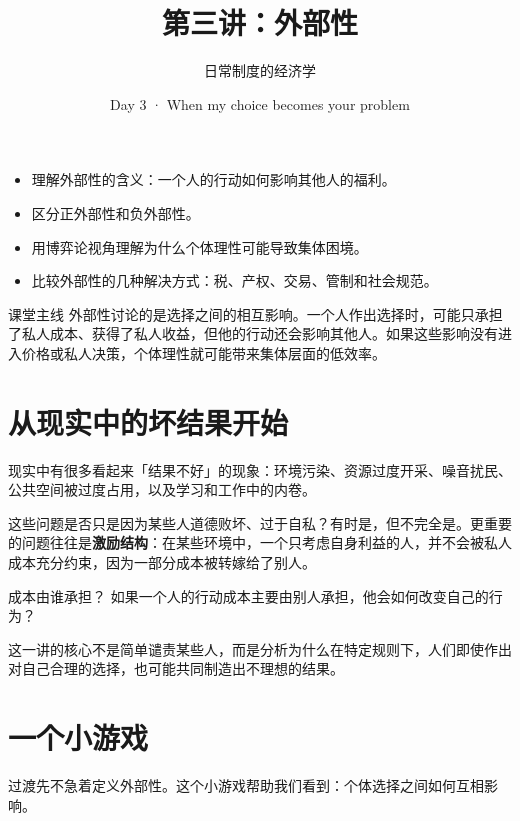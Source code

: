 \documentclass[10pt,a4paper]{ctexart}
\title{\vspace{-2em}\bfseries 第三讲：外部性}
\author{日常制度的经济学}
\date{Day 3 · When my choice becomes your problem}
\newcommand{\transitionnote}[1]{\begin{conceptbox}{过渡}#1\end{conceptbox}}
\begin{document}
\maketitle
\thispagestyle{fancy}

\begin{goalsbox}
\begin{itemize}
  \item 理解外部性的含义：一个人的行动如何影响其他人的福利。
  \item 区分正外部性和负外部性。
  \item 用博弈论视角理解为什么个体理性可能导致集体困境。
  \item 比较外部性的几种解决方式：税、产权、交易、管制和社会规范。
\end{itemize}
\end{goalsbox}

\begin{keybox}{课堂主线}
外部性讨论的是选择之间的相互影响。一个人作出选择时，可能只承担了私人成本、获得了私人收益，但他的行动还会影响其他人。如果这些影响没有进入价格或私人决策，个体理性就可能带来集体层面的低效率。
\end{keybox}

\section{从现实中的坏结果开始}

现实中有很多看起来「结果不好」的现象：环境污染、资源过度开采、噪音扰民、公共空间被过度占用，以及学习和工作中的内卷。

这些问题是否只是因为某些人道德败坏、过于自私？有时是，但不完全是。更重要的问题往往是\textbf{激励结构}：在某些环境中，一个只考虑自身利益的人，并不会被私人成本充分约束，因为一部分成本被转嫁给了别人。

\begin{discussionbox}{成本由谁承担？}
如果一个人的行动成本主要由别人承担，他会如何改变自己的行为？
\end{discussionbox}

这一讲的核心不是简单谴责某些人，而是分析为什么在特定规则下，人们即使作出对自己合理的选择，也可能共同制造出不理想的结果。

\section{一个小游戏}

\transitionnote{先不急着定义外部性。这个小游戏帮助我们看到：个体选择之间如何互相影响。}
\end{document}
